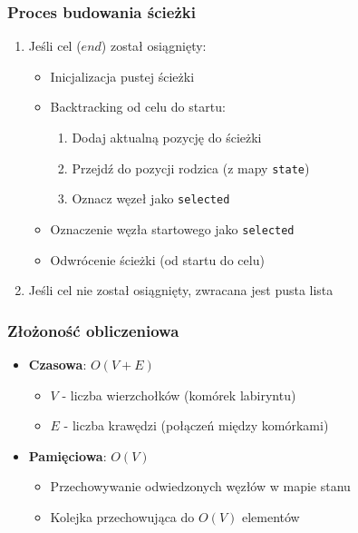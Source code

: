\documentclass[../../../../doc.tex]{subfiles}
\begin{document}
\subsubsection{Proces budowania ścieżki}
\begin{enumerate}
  \item Jeśli cel ($end$) został osiągnięty:
        \begin{itemize}
          \item Inicjalizacja pustej ścieżki
          \item Backtracking od celu do startu:
                \begin{enumerate}
                  \item Dodaj aktualną pozycję do ścieżki
                  \item Przejdź do pozycji rodzica (z mapy \texttt{state})
                  \item Oznacz węzeł jako \texttt{selected}
                \end{enumerate}
          \item Oznaczenie węzła startowego jako \texttt{selected}
          \item Odwrócenie ścieżki (od startu do celu)
        \end{itemize}
  \item Jeśli cel nie został osiągnięty, zwracana jest pusta lista
\end{enumerate}


\subsubsection{Złożoność obliczeniowa}
\begin{itemize}
  \item \textbf{Czasowa}: $O(V + E)$
        \begin{itemize}
          \item $V$ - liczba wierzchołków (komórek labiryntu)
          \item $E$ - liczba krawędzi (połączeń między komórkami)
        \end{itemize}
  \item \textbf{Pamięciowa}: $O(V)$
        \begin{itemize}
          \item Przechowywanie odwiedzonych węzłów w mapie stanu
          \item Kolejka przechowująca do $O(V)$ elementów
        \end{itemize}
\end{itemize}
\end{document}
